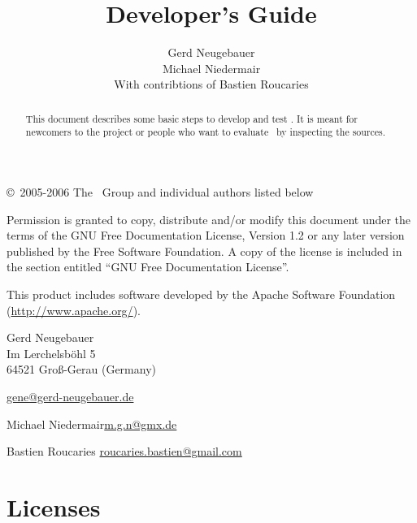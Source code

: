 \documentclass{extex-doc}
\begin{document}

\begin{titlepage}\parindent=0pt

  \title{Developer's Guide}
  \author{Gerd Neugebauer\\[2ex]%
    Michael Niedermair\\[2ex]%
    With contribtions of Bastien Roucaries}
  \maketitle

  \begin{center}
    \begin{abstract}\parindent=0pt
      This document describes some basic steps to develop and test
      \ExTeX.  It is meant for newcomers to the project or people who
      want to evaluate \ExTeX\ by inspecting the sources.
    \end{abstract}
  \end{center}
  \newpage
  \footnotesize
  \copyright\ 2005-2006 The \ExTeX\ Group and individual authors listed below
  \medskip

Permission is granted to copy, distribute and/or modify this document
under the terms of the GNU Free Documentation License, Version 1.2 or
any later version published by the Free Software Foundation. A copy of
the license is included in the section entitled ``GNU Free
Documentation License''.
\bigskip

This product includes software developed by the Apache Software
Foundation (\url{http://www.apache.org/}).

\vfill

Gerd Neugebauer\\
Im Lerchelsb\"ohl 5\\
64521 Gro\ss-Gerau (Germany)
\smallskip

\href{mailto://gene@gerd-neugebauer.de}{gene@gerd-neugebauer.de}
\bigskip

Michael Niedermair\hfill\href{mailto://m.g.n@gmx.de}{m.g.n@gmx.de}

Bastien Roucaries\hfill
\href{mailto://roucaries.bastien@gmail.com}{roucaries.bastien@gmail.com}


\end{titlepage}

\tableofcontents
\newpage












\appendix
\chapter{Licenses}

\end{document}
